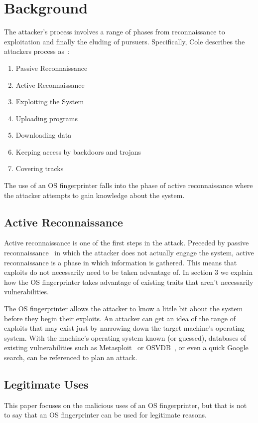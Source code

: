 \section{Background}

The attacker's process involves a range of phases from reconnaissance to exploitation and finally the eluding of pursuers. Specifically, Cole describes the attackers process as~\cite{Cole02}:

\begin{enumerate}
	\item Passive Reconnaissance
	\item Active Reconnaissance
	\item Exploiting the System
	\item Uploading programs
	\item Downloading data
	\item Keeping access by backdoors and trojans
	\item Covering tracks
\end{enumerate}

The use of an OS fingerprinter falls into the phase of active reconnaissance where the attacker attempts to gain knowledge about the system. 

\subsection{Active Reconnaissance}
Active reconnaissance is one of the first steps in the attack. Preceded by passive reconnaissance~\cite{Rouse12} in which the attacker does not actually engage the system, active reconnaissance is a phase in which information is gathered. This means that exploits do not necessarily need to be taken advantage of. In section 3 we explain how the OS fingerprinter takes advantage of existing traits that aren't necessarily vulnerabilities.

The OS fingerprinter allows the attacker to know a little bit about the system before they begin their exploits. An attacker can get an idea of the range of exploits that may exist just by narrowing down the target machine's operating system. With the machine's operating system known (or guessed), databases of existing vulnerabilities such as Metasploit~\cite{Metasploit1} or OSVDB~\cite{OSVDB1}, or even a quick Google search, can be referenced to plan an attack.


\subsection{Legitimate Uses}
This paper focuses on the malicious uses of an OS fingerprinter, but that is not to say that an OS fingerprinter can be used for legitimate reasons. 

